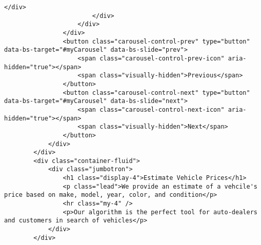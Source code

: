 \begin{lstlisting}[style=htmlcssjs]
                            </div>
                        </div>
                    </div>
                </div>
                <button class="carousel-control-prev" type="button" data-bs-target="#myCarousel" data-bs-slide="prev">
                    <span class="carousel-control-prev-icon" aria-hidden="true"></span>
                    <span class="visually-hidden">Previous</span>
                </button>
                <button class="carousel-control-next" type="button" data-bs-target="#myCarousel" data-bs-slide="next">
                    <span class="carousel-control-next-icon" aria-hidden="true"></span>
                    <span class="visually-hidden">Next</span>
                </button>
            </div>
        </div>
        <div class="container-fluid">
            <div class="jumbotron">
                <h1 class="display-4">Estimate Vehicle Prices</h1>
                <p class="lead">We provide an estimate of a vehcile's price based on make, model, year, color, and condition</p>
                <hr class="my-4" />
                <p>Our algorithm is the perfect tool for auto-dealers and customers in search of vehicles</p>
            </div>
        </div>


\end{lstlisting}

